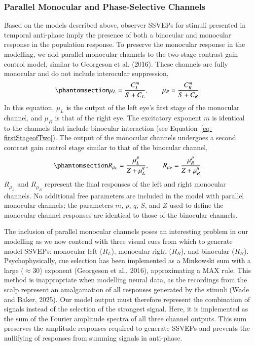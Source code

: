 \documentclass[review,
  12pt,
]{elsarticle}
\begin{document}
\subsubsection{Parallel Monocular and Phase-Selective
Channels}\label{parallel-monocular-and-phase-selective-channels}

Based on the models described above, observer SSVEPs for stimuli
presented in temporal anti-phase imply the presence of both a binocular
and monocular response in the population response. To preserve the
monocular response in the modelling, we add parallel monocular channels
to the two-stage contrast gain control model, similar to Georgeson et
al. (2016). These channels are fully monocular and do not include
interocular suppression,
\begin{equation}\phantomsection\label{eq-monocFirstStage}{
\mu_L = \frac{C_L^m}{S + C_L}, \qquad  \mu_R = \frac{C_R^m}{S + C_R}.
}\end{equation} In this equation, \(\mu_L\) is the output of the left
eye's first stage of the monocular channel, and \(\mu_R\) is that of the
right eye. The excitatory exponent \(m\) is identical to the channels
that include binocular interaction (see
Equation~\ref{eq-firstStageofTwo}). The output of the monocular channels
undergoes a second contrast gain control stage similar to that of the
binocular channel,
\begin{equation}\phantomsection\label{eq-monocSecondStage}{
R_{\mu_L} = \frac{\mu_L^p}{Z + \mu_L^q}, \qquad  R_{\mu_R} = \frac{\mu_R^p}{Z + \mu_R^q}.
}\end{equation} \(R_{\mu_L}\) and \(R_{\mu_R}\) represent the final
responses of the left and right monocular channels. No additional free
parameters are included in the model with parallel monocular channels;
the parameters \(m\), \(p\), \(q\), \(S\), and \(Z\) used to define the
monocular channel responses are identical to those of the binocular
channels.

The inclusion of parallel monocular channels poses an interesting
problem in our modelling as we now contend with three visual cues from
which to generate model SSVEPs: monocular left (\(R_L\)), monocular
right (\(R_R\)), and binocular (\(R_B\)). Psychophysically, cue
selection has been implemented as a Minkowski sum with a large
(\(\approx 30\)) exponent (Georgeson et al., 2016), approximating a MAX
rule. This method is inappropriate when modelling neural data, as the
recordings from the scalp represent an amalgamation of all responses
generated by the stimuli (Wade and Baker, 2025). Our model output must
therefore represent the combination of signals instead of the selection
of the strongest signal. Here, it is implemented as the sum of the
Fourier amplitude spectra of all three channel outputs. This sum
preserves the amplitude responses required to generate SSVEPs and
prevents the nullifying of responses from summing signals in anti-phase.
\end{document}
